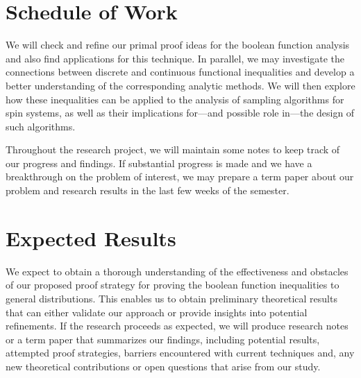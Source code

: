 \documentclass[letterpaper]{article}
\begin{document}
\section*{Schedule of Work}
We will check and refine our primal proof ideas for the boolean function analysis and also find applications for this technique.
In parallel, we may investigate the connections between discrete and continuous functional inequalities and develop a better understanding of the corresponding analytic methods.
We will then explore how these inequalities can be applied to the analysis of sampling algorithms for spin systems, as well as their implications for—and possible role in—the design of such algorithms.

Throughout the research project, we will maintain some notes to keep track of our progress and findings.
If substantial progress is made and we have a breakthrough on the problem of interest, we may prepare a term paper about our problem and research results in the last few weeks of the semester.

\section*{Expected Results}
We expect to obtain a thorough understanding of the effectiveness and obstacles of our proposed proof strategy for proving the boolean function inequalities to general distributions.
This enables us to obtain preliminary theoretical results that can either validate our approach or provide insights into potential refinements.
If the research proceeds as expected, we will produce research notes or a term paper that summarizes our findings, including potential results, attempted proof strategies, barriers encountered with current techniques and, any new theoretical contributions or open questions that arise from our study.


\end{document}
